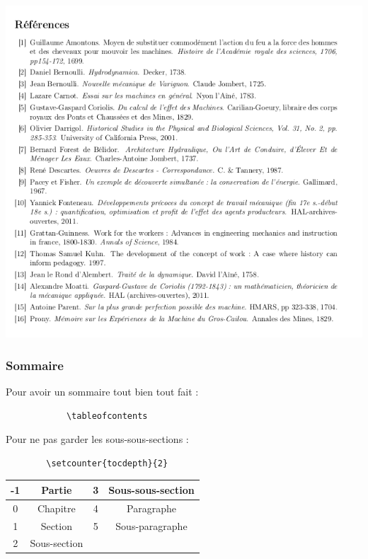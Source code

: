 \documentclass[handout]{beamer}
\begin{document}
	\begin{frame}

		\centering

		\includegraphics[scale=0.45]{Images/Rappels/biblio.png}

	\end{frame}

	\begin{frame}[fragile=singleslide]
		\frametitle{Sommaire}

		\centering
		Pour avoir un sommaire tout bien tout fait :\\
		\begin{verbatim}
			\tableofcontents
		\end{verbatim}

		Pour ne pas garder les sous-sous-sections :

		\begin{verbatim}
		\setcounter{tocdepth}{2}
		\end{verbatim}

		\begin{tabular}{|c|c|c|c|}
			\hline
			-1 & Partie & 3 & Sous-sous-section\\ \hline
			0 & Chapitre & 4 & Paragraphe \\ \hline
			1 & Section & 5 & Sous-paragraphe \\ \hline
			2 & Sous-section & & \\ \hline
		\end{tabular}

	\end{frame}
\end{document}
